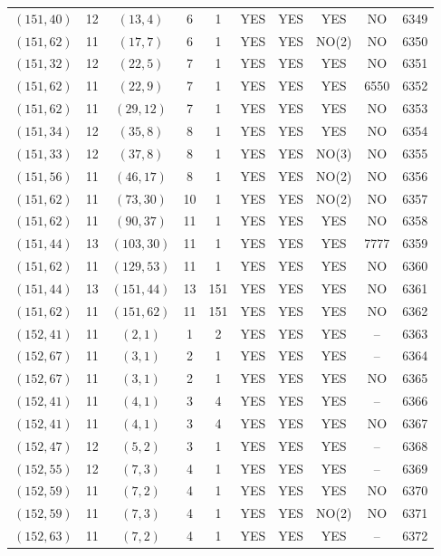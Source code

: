 \begin{longtable}{|c|c|c|c|c|c|c|c|c|c|}
$(151, 40)$ & 12 & $(13, 4)$ & 6 & 1 & YES & YES & YES & NO & 6349\\
$(151, 62)$ & 11 & $(17, 7)$ & 6 & 1 & YES & YES & NO(2) & NO & 6350\\
$(151, 32)$ & 12 & $(22, 5)$ & 7 & 1 & YES & YES & YES & NO & 6351\\
$(151, 62)$ & 11 & $(22, 9)$ & 7 & 1 & YES & YES & YES & 6550 & 6352\\
$(151, 62)$ & 11 & $(29, 12)$ & 7 & 1 & YES & YES & YES & NO & 6353\\
$(151, 34)$ & 12 & $(35, 8)$ & 8 & 1 & YES & YES & YES & NO & 6354\\
$(151, 33)$ & 12 & $(37, 8)$ & 8 & 1 & YES & YES & NO(3) & NO & 6355\\
$(151, 56)$ & 11 & $(46, 17)$ & 8 & 1 & YES & YES & NO(2) & NO & 6356\\
$(151, 62)$ & 11 & $(73, 30)$ & 10 & 1 & YES & YES & NO(2) & NO & 6357\\
$(151, 62)$ & 11 & $(90, 37)$ & 11 & 1 & YES & YES & YES & NO & 6358\\
$(151, 44)$ & 13 & $(103, 30)$ & 11 & 1 & YES & YES & YES & 7777 & 6359\\
$(151, 62)$ & 11 & $(129, 53)$ & 11 & 1 & YES & YES & YES & NO & 6360\\
$(151, 44)$ & 13 & $(151, 44)$ & 13 & 151 & YES & YES & YES & NO & 6361\\
$(151, 62)$ & 11 & $(151, 62)$ & 11 & 151 & YES & YES & YES & NO & 6362\\
$(152, 41)$ & 11 & $(2, 1)$ & 1 & 2 & YES & YES & YES & -- & 6363\\
$(152, 67)$ & 11 & $(3, 1)$ & 2 & 1 & YES & YES & YES & -- & 6364\\
$(152, 67)$ & 11 & $(3, 1)$ & 2 & 1 & YES & YES & YES & NO & 6365\\
$(152, 41)$ & 11 & $(4, 1)$ & 3 & 4 & YES & YES & YES & -- & 6366\\
$(152, 41)$ & 11 & $(4, 1)$ & 3 & 4 & YES & YES & YES & NO & 6367\\
$(152, 47)$ & 12 & $(5, 2)$ & 3 & 1 & YES & YES & YES & -- & 6368\\
$(152, 55)$ & 12 & $(7, 3)$ & 4 & 1 & YES & YES & YES & -- & 6369\\
$(152, 59)$ & 11 & $(7, 2)$ & 4 & 1 & YES & YES & YES & NO & 6370\\
$(152, 59)$ & 11 & $(7, 3)$ & 4 & 1 & YES & YES & NO(2) & NO & 6371\\
$(152, 63)$ & 11 & $(7, 2)$ & 4 & 1 & YES & YES & YES & -- & 6372\\

\end{longtable}
